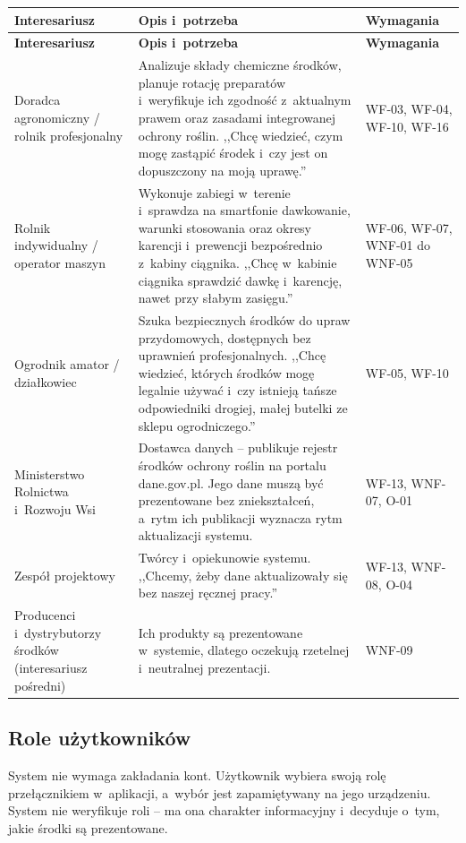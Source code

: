 \begingroup
\small
\begin{longtable}{|>{\raggedright\arraybackslash}p{3.2cm}|p{8.8cm}|>{\raggedright\arraybackslash}p{2.4cm}|}
\hline
\textbf{Interesariusz} & \textbf{Opis i~potrzeba} & \textbf{Wymagania} \\
\hline
\endfirsthead
\hline
\textbf{Interesariusz} & \textbf{Opis i~potrzeba} & \textbf{Wymagania} \\
\hline
\endhead
Doradca agronomiczny / rolnik profesjonalny &
Analizuje składy chemiczne środków, planuje rotację preparatów i~weryfikuje
ich zgodność z~aktualnym prawem oraz zasadami integrowanej ochrony roślin.
,,Chcę wiedzieć, czym mogę zastąpić środek i~czy jest on dopuszczony na moją
uprawę.'' &
WF-03, WF-04, WF-10, WF-16 \\
\hline
Rolnik indywidualny / operator maszyn &
Wykonuje zabiegi w~terenie i~sprawdza na smartfonie dawkowanie, warunki
stosowania oraz okresy karencji i~prewencji bezpośrednio z~kabiny ciągnika.
,,Chcę w~kabinie ciągnika sprawdzić dawkę i~karencję, nawet przy słabym
zasięgu.'' &
WF-06, WF-07, WNF-01 do WNF-05 \\
\hline
Ogrodnik amator / działkowiec &
Szuka bezpiecznych środków do upraw przydomowych, dostępnych bez uprawnień
profesjonalnych. ,,Chcę wiedzieć, których środków mogę legalnie używać
i~czy istnieją tańsze odpowiedniki drogiej, małej butelki ze sklepu
ogrodniczego.'' &
WF-05, WF-10 \\
\hline
Ministerstwo Rolnictwa i~Rozwoju Wsi &
Dostawca danych -- publikuje rejestr środków ochrony roślin na portalu
dane.gov.pl. Jego dane muszą być prezentowane bez zniekształceń, a~rytm ich
publikacji wyznacza rytm aktualizacji systemu. &
WF-13, WNF-07, O-01 \\
\hline
Zespół projektowy &
Twórcy i~opiekunowie systemu. ,,Chcemy, żeby dane aktualizowały się bez
naszej ręcznej pracy.'' &
WF-13, WNF-08, O-04 \\
\hline
Producenci i~dystrybutorzy środków (interesariusz pośredni) &
Ich produkty są prezentowane w~systemie, dlatego oczekują rzetelnej
i~neutralnej prezentacji. &
WNF-09 \\
\hline
\end{longtable}
\endgroup

\subsection{Role użytkowników}

System nie wymaga zakładania kont. Użytkownik wybiera swoją rolę przełącznikiem
w~aplikacji, a~wybór jest zapamiętywany na jego urządzeniu. System nie
weryfikuje roli -- ma ona charakter informacyjny i~decyduje o~tym, jakie środki
są prezentowane.

